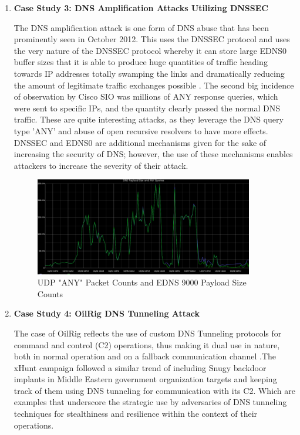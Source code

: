 \begin{enumerate}
\vspace{200pt}


\item\textbf{ Case Study 3: DNS Amplification Attacks Utilizing DNSSEC }

The DNS amplification attack is one form of DNS abuse that has been prominently seen in October 2012. This uses the DNSSEC protocol and uses the very nature of the DNSSEC protocol whereby it can store large EDNS0 buffer sizes that it is able to produce huge quantities of traffic heading towards IP addresses totally swamping the links and dramatically reducing the amount of legitimate traffic exchanges possible \cite{ Middleton2024}.  The second big incidence of observation by Cisco SIO was millions of ANY response queries, which were sent to specific IPs, and the quantity clearly passed the normal DNS traffic. These are quite interesting attacks, as they leverage the DNS query type 'ANY' and abuse of open recursive resolvers to have more effects. DNSSEC and EDNS0 are additional mechanisms given for the sake of increasing the security of DNS; however, the use of these mechanisms enables attackers to increase the severity of their attack.

\captionsetup{font= footnotesize}
\begin{figure}[ht!]
    \centering
    \includegraphics[width=0.9\textwidth]{background/UDP.png}
    \caption{UDP "ANY" Packet Counts and EDNS 9000 Payload Size Counts}
    \label{fig:figNine}
\end{figure}

\item\textbf{ Case Study 4: OilRig DNS Tunneling Attack }

The case of OilRig reflects the use of custom DNS Tunneling protocols for command and control (C2) operations, thus making it dual use in nature, both in normal operation and on a fallback communication channel \cite{paloaltonetworks2021dnsattacks}.The xHunt campaign \cite{unit42_xhunt_2021} followed a similar trend of including Snugy backdoor implants in Middle Eastern government organization targets and keeping track of them using DNS tunneling for communication with its C2.  Which are examples that underscore the strategic use by adversaries of DNS tunneling techniques for stealthiness and resilience within the context of their operations. \cite{unit42_2021}


\end{enumerate}
